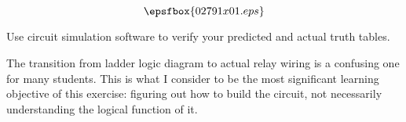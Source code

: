 

$$\epsfbox{02791x01.eps}$$

\vfil \eject






Use circuit simulation software to verify your predicted and actual truth tables.







The transition from ladder logic diagram to actual relay wiring is a confusing one for many students.  This is what I consider to be the most significant learning objective of this exercise: figuring out how to build the circuit, not necessarily understanding the logical function of it.




